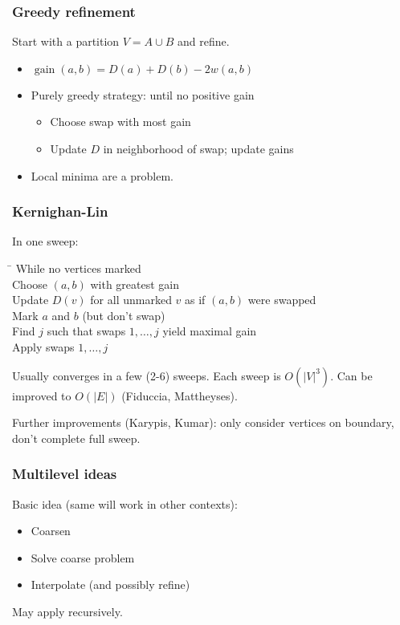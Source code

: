 \documentclass{beamer}
\begin{document}
\begin{frame}
  \frametitle{Greedy refinement}

  \begin{center}
    \begin{tikzpicture}[scale=0.6]
      
    \end{tikzpicture}
  \end{center}
  Start with a partition $V = A \cup B$ and refine.
  \begin{itemize}
  \item $\operatorname{gain}(a,b) = D(a) + D(b) - 2w(a,b)$
  \item Purely greedy strategy: until no positive gain
    \begin{itemize}
    \item Choose swap with most gain
    \item Update $D$ in neighborhood of swap; update gains
    \end{itemize}
  \item Local minima are a problem.
  \end{itemize}
\end{frame}


\begin{frame}
  \frametitle{Kernighan-Lin}

  In one sweep:
  \begin{tabbing}
    \qquad \= \kill
    While no vertices marked \\
    \> Choose $(a,b)$ with greatest gain \\
    \> Update $D(v)$ for all unmarked $v$ as if $(a,b)$ were swapped \\
    \> Mark $a$ and $b$ (but don't swap) \\
    Find $j$ such that swaps $1, \ldots, j$ yield maximal gain \\
    Apply swaps $1, \ldots, j$
  \end{tabbing}
  Usually converges in a few (2-6) sweeps.  Each sweep is $O(|V|^3)$.
  Can be improved to $O(|E|)$ (Fiduccia, Mattheyses).
  
  \vspace{5mm}
  Further improvements (Karypis, Kumar): only consider vertices on boundary,
  don't complete full sweep.
\end{frame}


\begin{frame}
  \frametitle{Multilevel ideas}

  Basic idea (same will work in other contexts):
  \begin{itemize}
  \item Coarsen
  \item Solve coarse problem
  \item Interpolate (and possibly refine)
  \end{itemize}
  May apply recursively.

\end{frame}
\end{document}
